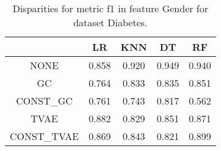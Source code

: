 \begin{table}
\caption{Disparities for metric f1 in feature Gender for dataset Diabetes.}
\label{tab:disp-DIABETES-Gender-f1}
\begin{tabular}{ccccc}
\toprule
 & LR & KNN & DT & RF \\
\midrule
NONE & 0.858 & 0.920 & 0.949 & 0.940 \\
GC & 0.764 & 0.833 & 0.835 & 0.851 \\
CONST\_GC & 0.761 & 0.743 & 0.817 & 0.562 \\
TVAE & 0.882 & 0.829 & 0.851 & 0.871 \\
CONST\_TVAE & 0.869 & 0.843 & 0.821 & 0.899 \\
\bottomrule
\end{tabular}
\end{table}
